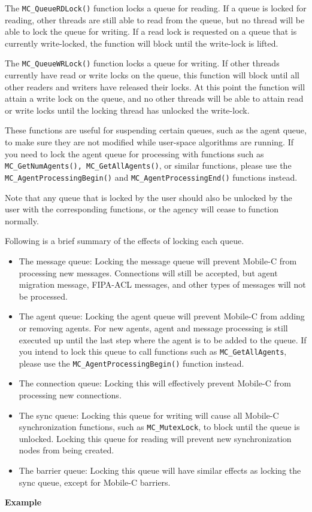 The \texttt{MC\_QueueRDLock()} function locks a queue for reading. If a queue
is locked for reading, other threads are still able to read from the queue, but
no thread will be able to lock the queue for writing. If a read lock is
requested on a queue that is currently write-locked, the function will block
until the write-lock is lifted.

The \texttt{MC\_QueueWRLock()} function locks a queue for writing. If other
threads currently have read or write locks on the queue, this function 
will block until all other readers and writers have released their locks.
At this point the function will attain a write lock on the queue, and no
other threads will be able to attain read or write locks until the 
locking thread has unlocked the write-lock.

These functions are useful for suspending certain queues, such as the agent queue,
to make sure they are not modified while user-space algorithms are running. If
you need to lock the agent queue for processing with functions such as
\texttt{MC\_GetNumAgents(), MC\_GetAllAgents()}, or similar functions, please
use the \texttt{MC\_AgentProcessingBegin()} and \texttt{MC\_AgentProcessingEnd()} 
functions instead.

Note that any queue that is locked by the user should also be unlocked by the user with 
the corresponding functions, or the agency will cease to function normally. 

Following is a brief summary of the effects of locking each queue.
\begin{itemize}
\item The message queue: Locking the message queue will prevent Mobile-C from
processing new messages. Connections will still be accepted, but agent
migration message, FIPA-ACL messages, and other types of messages will not be
processed.
\item The agent queue: Locking the agent queue will prevent Mobile-C from
adding or removing agents. For new agents, agent and message processing is
still executed up until the last step where the agent is to be added to the
queue. If you intend to lock this queue to call functions such as 
\texttt{MC\_GetAllAgents}, please use the \texttt{MC\_AgentProcessingBegin()}
function instead.
\item The connection queue: Locking this will effectively prevent Mobile-C from
processing new connections.
\item The sync queue: Locking this queue for writing will cause all Mobile-C
synchronization functions, such as \texttt{MC\_MutexLock}, to block until the
queue is unlocked. Locking this queue for reading will prevent new
synchronization nodes from being created.
\item The barrier queue: Locking this queue will have similar effects as
locking the sync queue, except for Mobile-C barriers.
\end{itemize}
\noindent
{\bf Example}\\
\noindent

\noindent

